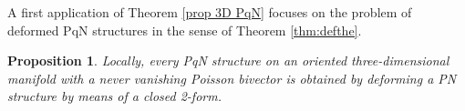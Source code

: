 \documentclass[12pt]{article}
\newtheorem{prop}[theorem]{Proposition}
\begin{document}
A first application of Theorem \ref{prop 3D PqN} focuses on the problem of deformed PqN structures in the sense of Theorem \ref{thm:defthe}. 
\begin{prop}\label{prop:local}
Locally, every PqN structure on an oriented three-dimensional manifold with a never vanishing Poisson bivector is obtained by deforming a PN structure by means of a closed 2-form. 
\end{prop}
\end{document}
